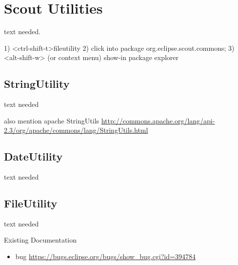 \documentclass[a4paper,10pt,twoside]{book}
\begin{document}
  \sloppy
\fi


\chapter{Scout Utilities}

text needed.

1) <ctrl-shift-t>fileutility
2) click into package org.eclipse.scout.commons;
3) <alt-shift-w> (or context menu) show-in package explorer

\section{StringUtility}
text needed

also mention apache StringUtils \url{http://commons.apache.org/lang/api-2.3/org/apache/commons/lang/StringUtils.html}

\section{DateUtility}
text needed


\section{FileUtility}
text needed

\noindent Existing Documentation
\begin{itemize}
  \item bug \url{https://bugs.eclipse.org/bugs/show_bug.cgi?id=394784}
\end{itemize}


\ifx\wholebook\relax\else
   
   
\end{document}
